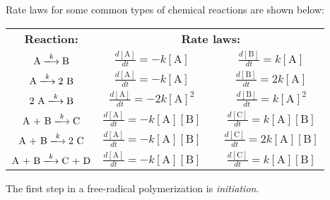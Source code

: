\begin{activity}
\begin{instructornotes}
\end{instructornotes}


\begin{model}
	\label{\labelbase:mdl:kineticeqns}

	Rate laws for some common types of chemical reactions are shown below:
	
	\vspace{-6pt}
	\begin{center}
		\renewcommand{\arraystretch}{2}
		\begin{tabular}{c c c c}
			\hspace{2cm}\textbf{Reaction:}\hspace{2cm} & \multicolumn{3}{c}{\hspace{0.5cm}\textbf{Rate laws:}\hspace{0.5cm}} \\
			$ \text{A} \xlongrightarrow{k} \text{B}$ & $\frac{d[\text{A}]}{dt} = -k[\text{A}]$ && $\frac{d[\text{B}]}{dt} = k[\text{A}]$ \\
			$ \text{A} \xlongrightarrow{k} 2\text{ B}$ & $\frac{d[\text{A}]}{dt} = -k[\text{A}]$ && $\frac{d[\text{B}]}{dt} = 2k[\text{A}]$ \\
			$\text{2 A} \xlongrightarrow{k} \text{B}$ & $\frac{d[\text{A}]}{dt} = -2k[\text{A}]^2$ && $\frac{d[\text{B}]}{dt} = k[\text{A}]^2$ \\
			$\text{A + B} \xlongrightarrow{k} \text{C}$ & $\frac{d[\text{A}]}{dt} = -k[\text{A}][\text{B}]$ && $\frac{d[\text{C}]}{dt} = k[\text{A}][\text{B}]$ \\
			$\text{A + B} \xlongrightarrow{k} \text{2 C}$ & $\frac{d[\text{A}]}{dt} = -k[\text{A}][\text{B}]$ && $\frac{d[\text{C}]}{dt} = 2 k[\text{A}][\text{B}]$ \\
			$\text{A + B} \xlongrightarrow{k} \text{C + D}$ & $\frac{d[\text{A}]}{dt} = -k[\text{A}][\text{B}]$ && $\frac{d[\text{C}]}{dt} = k[\text{A}][\text{B}]$ \\
		\end{tabular}
	\end{center}
	\vspace{6pt}
	
\end{model}


\begin{ctqs}

	\question The first step in a free-radical polymerization is \emph{initiation}.  
		
		\begin{enumerate}
		

\end{enumerate}
\end{ctqs}
\end{activity}

